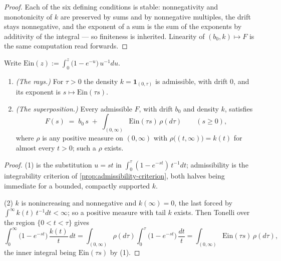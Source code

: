 \begin{proof}
\leanok
Each of the six defining conditions is stable: nonnegativity and monotonicity of $k$ are
preserved by sums and by nonnegative multiples, the drift stays nonnegative, and the exponent of
a sum is the sum of the exponents by additivity of the integral --- so finiteness is inherited.
Linearity of $(b_0,k) \mapsto F$ is the same computation read forwards.
\end{proof}

\begin{lemma}\label{lem:dickman-superposition}
\leanok
Write $\mathrm{Ein}(z) := \int_0^z \bigl(1 - e^{-u}\bigr)\,u^{-1}du$.
\begin{enumerate}
\item \emph{(The rays.)} For $\tau > 0$ the density $k = \mathbf{1}_{(0,\tau)}$ is admissible,
with drift $0$, and its exponent is $s \mapsto \mathrm{Ein}(\tau s)$.
\item \emph{(The superposition.)} Every admissible $F$, with drift $b_0$ and density $k$,
satisfies
\[
  F(s) \;=\; b_0\, s \;+\; \int_{(0,\infty)} \mathrm{Ein}(\tau s)\,\rho(d\tau)
  \qquad (s \ge 0),
\]
where $\rho$ is any positive measure on $(0,\infty)$ with $\rho\bigl((t,\infty)\bigr) = k(t)$ for
almost every $t > 0$; such a $\rho$ exists.
\end{enumerate}
\statusT
\end{lemma}

\begin{proof}
\leanok
(1) is the substitution $u = st$ in $\int_0^\tau (1 - e^{-st})\,t^{-1}dt$; admissibility is the
integrability criterion of \ref{prop:admissibility-criterion}, both halves being immediate for a
bounded, compactly supported $k$.

(2) $k$ is nonincreasing and nonnegative and $k(\infty) = 0$, the last forced by
$\int^\infty k(t)\,t^{-1}dt < \infty$; so a positive measure with tail $k$ exists. Then Tonelli
over the region $\{0 < t < \tau\}$ gives
\[
  \int_0^\infty \bigl(1 - e^{-st}\bigr)\,\frac{k(t)}{t}\,dt
  = \int_{(0,\infty)} \rho(d\tau) \int_0^\tau \bigl(1 - e^{-st}\bigr)\,\frac{dt}{t}
  = \int_{(0,\infty)} \mathrm{Ein}(\tau s)\,\rho(d\tau),
\]
the inner integral being $\mathrm{Ein}(\tau s)$ by (1).
\end{proof}
